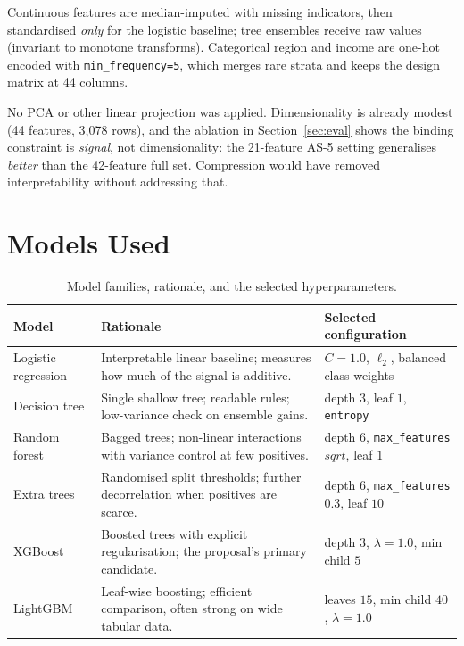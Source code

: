 \documentclass[11pt]{article}
\begin{document}
Continuous features are median-imputed with missing indicators, then standardised \emph{only} for
the logistic baseline; tree ensembles receive raw values (invariant to monotone transforms).
Categorical region and income are one-hot encoded with \texttt{min\_frequency=5}, which merges
rare strata and keeps the design matrix at 44 columns.

No PCA or other linear projection was applied. Dimensionality is already modest (44 features,
3,078 rows), and the ablation in Section~\ref{sec:eval} shows the binding
constraint is \emph{signal}, not dimensionality: the 21-feature AS-5 setting generalises
\emph{better} than the 42-feature full set. Compression would have removed interpretability
without addressing that.

\section{Models Used}

\begin{table}[H]
\centering
\caption{Model families, rationale, and the selected hyperparameters.}
\label{tab:models}
\small
\begin{tabular}{@{}>{\raggedright\arraybackslash}p{3.1cm}>{\raggedright\arraybackslash}p{5.5cm}>{\raggedright\arraybackslash}p{6.6cm}@{}}
\toprule
\textbf{Model} & \textbf{Rationale} & \textbf{Selected configuration} \\
\midrule
Logistic regression & Interpretable linear baseline; measures how much of the signal is additive. &
$C=1.0$, $\ell_2$, balanced class weights \\
Decision tree & Single shallow tree; readable rules; low-variance check on ensemble gains. &
depth $3$, leaf $1$, \texttt{entropy} \\
Random forest & Bagged trees; non-linear interactions with variance control at few positives. &
depth $6$, \texttt{max\_features} $sqrt$, leaf $1$ \\
Extra trees & Randomised split thresholds; further decorrelation when positives are scarce. &
depth $6$, \texttt{max\_features} $0.3$, leaf $10$ \\
XGBoost & Boosted trees with explicit regularisation; the proposal's primary candidate. &
depth $3$, $\lambda=1.0$, min child $5$ \\
LightGBM & Leaf-wise boosting; efficient comparison, often strong on wide tabular data. &
leaves $15$, min child $40$, $\lambda=1.0$ \\
\bottomrule
\end{tabular}
\end{table}
\end{document}
